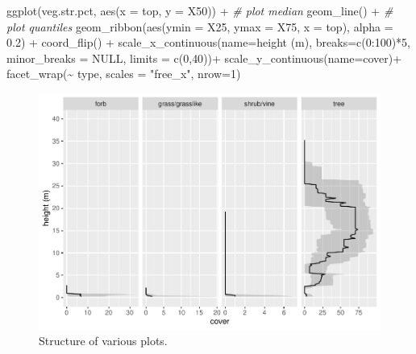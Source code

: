\documentclass[
]{book}
\newenvironment{Shaded}{\begin{snugshade}}{\end{snugshade}}
\newcommand{\AttributeTok}[1]{\textcolor[rgb]{0.77,0.63,0.00}{#1}}
\newcommand{\CommentTok}[1]{\textcolor[rgb]{0.56,0.35,0.01}{\textit{#1}}}
\newcommand{\ConstantTok}[1]{\textcolor[rgb]{0.00,0.00,0.00}{#1}}
\newcommand{\DecValTok}[1]{\textcolor[rgb]{0.00,0.00,0.81}{#1}}
\newcommand{\FloatTok}[1]{\textcolor[rgb]{0.00,0.00,0.81}{#1}}
\newcommand{\FunctionTok}[1]{\textcolor[rgb]{0.00,0.00,0.00}{#1}}
\newcommand{\NormalTok}[1]{#1}
\newcommand{\SpecialCharTok}[1]{\textcolor[rgb]{0.00,0.00,0.00}{#1}}
\newcommand{\StringTok}[1]{\textcolor[rgb]{0.31,0.60,0.02}{#1}}
\begin{document}
\begin{Shaded}
\begin{Highlighting}[]
\FunctionTok{ggplot}\NormalTok{(veg.str.pct, }\FunctionTok{aes}\NormalTok{(}\AttributeTok{x =}\NormalTok{ top, }\AttributeTok{y =}\NormalTok{ X50)) }\SpecialCharTok{+}
  \CommentTok{\# plot median}
  \FunctionTok{geom\_line}\NormalTok{() }\SpecialCharTok{+}
  \CommentTok{\# plot quantiles}
  \FunctionTok{geom\_ribbon}\NormalTok{(}\FunctionTok{aes}\NormalTok{(}\AttributeTok{ymin =}\NormalTok{ X25, }\AttributeTok{ymax =}\NormalTok{ X75, }\AttributeTok{x =}\NormalTok{ top), }\AttributeTok{alpha =} \FloatTok{0.2}\NormalTok{) }\SpecialCharTok{+}
  \FunctionTok{coord\_flip}\NormalTok{() }\SpecialCharTok{+}
  \FunctionTok{scale\_x\_continuous}\NormalTok{(}\AttributeTok{name=}\StringTok{\textquotesingle{}height (m)\textquotesingle{}}\NormalTok{, }\AttributeTok{breaks=}\FunctionTok{c}\NormalTok{(}\DecValTok{0}\SpecialCharTok{:}\DecValTok{100}\NormalTok{)}\SpecialCharTok{*}\DecValTok{5}\NormalTok{,  }\AttributeTok{minor\_breaks =} \ConstantTok{NULL}\NormalTok{, }\AttributeTok{limits =} \FunctionTok{c}\NormalTok{(}\DecValTok{0}\NormalTok{,}\DecValTok{40}\NormalTok{))}\SpecialCharTok{+}
  \FunctionTok{scale\_y\_continuous}\NormalTok{(}\AttributeTok{name=}\StringTok{\textquotesingle{}cover\textquotesingle{}}\NormalTok{)}\SpecialCharTok{+}
  \FunctionTok{facet\_wrap}\NormalTok{(}\SpecialCharTok{\textasciitilde{}}\NormalTok{ type, }\AttributeTok{scales =} \StringTok{"free\_x"}\NormalTok{, }\AttributeTok{nrow=}\DecValTok{1}\NormalTok{)}
\end{Highlighting}
\end{Shaded}

\begin{figure}
\centering
\includegraphics{vegbook1_files/figure-latex/unnamed-chunk-2-1.pdf}
\caption{\label{fig:unnamed-chunk-2}Structure of various plots.}
\end{figure}

  
\end{document}
